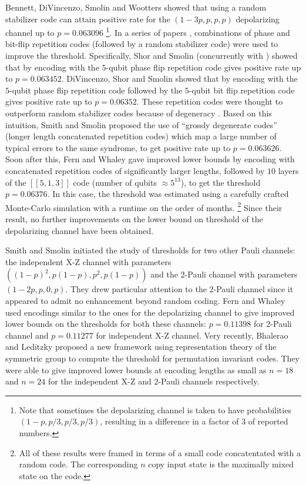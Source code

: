 \documentclass[11pt]{article}
\begin{document}
Bennett, DiVincenzo, Smolin and Wootters \cite{bennett1996mixed} showed that using a random stabilizer code can attain positive rate for the $(1-3p, p, p, p)$ depolarizing channel up to $p = 0.063096$ \footnote{Note that sometimes the depolarizing channel is taken to have probabilities $(1-p,p/3,p/3,p/3)$, resulting in a difference in a factor of 3 of reported numbers.}. In a series of papers \cite{divincenzo1998quantum,shor1996quantumerrorcorrectingcodesneed,smith2007degenerate}, combinations of phase and bit-flip repetition codes (followed by a random stabilizer code) were used to improve the threshold. Specifically, Shor and Smolin \cite{shor1996quantumerrorcorrectingcodesneed} (concurrently with \cite{bennett1996mixed}) showed that by encoding with the $5$-qubit phase flip repetition code gives positive rate up to $p = 0.063452$. DiVincenzo, Shor and Smolin \cite{divincenzo1998quantum} showed that by encoding with the $5$-qubit phase flip repetition code followed by the $5$-qubit bit flip repetition code gives positive rate up to $p = 0.06352$. These repetition codes were thought to outperform random stabilizer codes because of degeneracy \cite{shor1996quantumerrorcorrectingcodesneed}. Based on this intuition, Smith and Smolin \cite{smith2007degenerate} proposed the use of ``grossly degenerate codes'' (longer length concatenated repetition codes) which map a large number of typical errors to the same syndrome, to get positive rate up to $p = 0.063626$. Soon after this, Fern and Whaley \cite{fern} gave improved lower bounds by encoding with concatenated repetition codes of significantly larger lengths, followed by $10$ layers of the $[[5,1,3]]$ code (number of qubits $\approx 5^{13}$), to get the threshold $p = 0.06376$. In this case, the threshold was estimated using a carefully crafted Monte-Carlo simulation with a runtime on the order of months. \footnote{All of these results were framed in terms of a small code concatentated with a random code.  The corresponding $n$ copy input state is the maximally mixed state on the code.}  Since their result, no further improvements on the lower bound on threshold of the depolarizing channel have been obtained.


Smith and Smolin \cite{smith2007degenerate} initiated the study of thresholds for two other Pauli channels: the independent X-Z channel with parameters $((1-p)^2, p(1-p), p^2, p(1-p))$ and the 2-Pauli channel with parameters $(1-2p, p, 0, p)$. They drew particular attention to the 2-Pauli channel since it appeared to admit no enhancement beyond random coding.  Fern and Whaley \cite{fern} used encodings similar to the ones for the depolarizing channel to give improved lower bounds on the thresholds for both these channels: $p = 0.11398$ for 2-Pauli channel and $p = 0.11277$ for independent X-Z channel. Very recently, Bhalerao and Leditzky proposed a new framework using representation theory of the symmetric group to compute the threshold for permutation invariant codes. They were able to give improved lower bounds at encoding lengths as small as $n = 18$ and $n = 24$ for the independent X-Z and 2-Pauli channels respectively.
\end{document}
